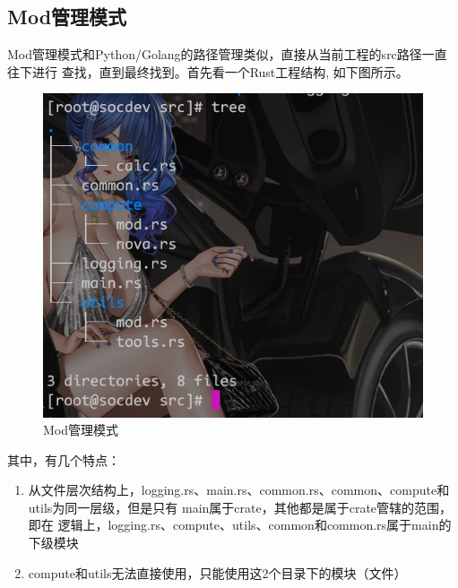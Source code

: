 \subsection{Mod管理模式}
Mod管理模式和Python/Golang的路径管理类似，直接从当前工程的src路径一直往下进行
查找，直到最终找到。首先看一个Rust工程结构, 如下图所示。
\begin{figure}[H]
  \centering
  \includegraphics[width=\linewidth]{rust_mod.png}
  \caption{Mod管理模式}
  \label{fig:rust_mod}
\end{figure}
其中，有几个特点：
\begin{enumerate}
  \item 从文件层次结构上，logging.rs、main.rs、common.rs、common、compute和
utils为同一层级，但是只有 main属于crate，其他都是属于crate管辖的范围，即在
逻辑上，logging.rs、compute、utils、common和common.rs属于main的下级模块
  \item compute和utils无法直接使用，只能使用这2个目录下的模块（文件）
\end{enumerate}

